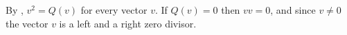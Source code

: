 By , $v^2 = Q(v)$ for every vector $v$. If $Q(v) = 0$ then $v v = 0$, and since $v \neq 0$ the vector $v$ is a left and a right zero divisor.
